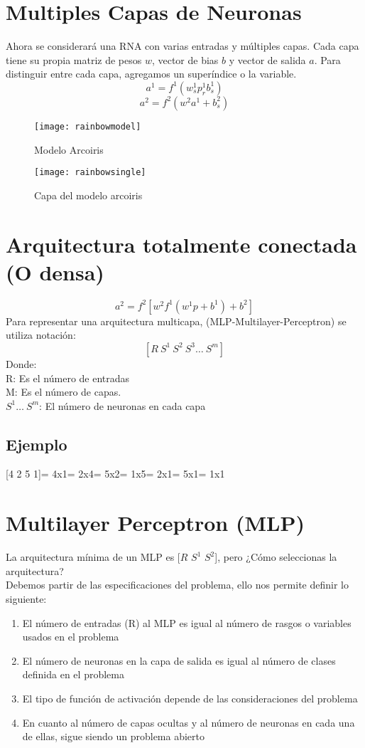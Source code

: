 \documentclass{article}
\begin{document}
\section{Multiples Capas de Neuronas}
Ahora se considerará una RNA con varias entradas y múltiples capas. Cada capa tiene su propia matriz de pesos $w$, vector de bias $b$ y vector de salida $a$. Para distinguir entre cada capa, agregamos un superíndice o la variable.
$$ a^1 = f^1(w_s^1p_r^1b_s^1)$$ $$a^2=f^2(w^2a^1+b_s^2)$$
\begin{figure}[h!]
	\centering
	\texttt{[image: rainbowmodel]}
	\caption{Modelo Arcoiris}
\end{figure}
\begin{figure}[h!]
	\centering
	\texttt{[image: rainbowsingle]}
	\caption{Capa del modelo arcoiris}
\end{figure}
\newpage
\section{Arquitectura totalmente conectada (O densa)}
$$ a^2 = f^2[w^2f^1(w^1p+b^1)+b^2] $$
Para representar una arquitectura multicapa, (MLP-Multilayer-Perceptron) se utiliza notación:$$ [R\ S^1\ S^2 \ S^3 \dots\ S^m]$$
Donde:\\
R: Es el número de entradas\\
M: Es el número de capas.\\
$S^1 \dots\ S^m$: El número de neuronas en cada capa
\subsection{Ejemplo}
[4 2 5 1]\newline
[$P$] = 4x1\newline
[$w^1$] = 2x4\newline
[$w^2$] = 5x2\newline
[$w^3$] = 1x5\newline
[$b^1$] = 2x1\newline
[$b^2$] = 5x1\newline
[$b^3$] = 1x1
\section{Multilayer Perceptron (MLP)}
La arquitectura mínima de un MLP es [$R$ $S^1$ $S^2$], pero ¿Cómo seleccionas la arquitectura?\\
Debemos partir de las especificaciones del problema, ello nos permite definir lo siguiente:
\begin{enumerate}
	\item El número de entradas (R) al MLP es igual al número de rasgos o variables usados en el problema
	\item El número de neuronas en la capa de salida es igual al número de clases definida en el problema
	\item El tipo de función de activación depende de las consideraciones del problema
	\item En cuanto al número de capas ocultas y al número de neuronas en cada una de ellas, sigue siendo un problema abierto
\end{enumerate}
\end{document}

